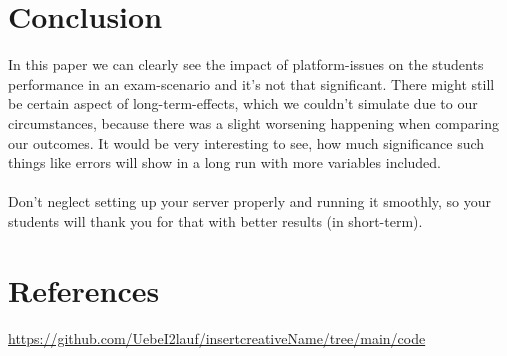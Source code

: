 \documentclass[12pt, a4paper]{article}
\begin{document}
\section{Conclusion}
In this paper we can clearly see the impact of platform-issues on the students performance in an exam-scenario and it's not that significant. There might still be certain aspect of long-term-effects,
which we couldn't simulate due to our circumstances, because there was a slight worsening happening when comparing our outcomes. It would be very interesting to see, how much significance such things like errors will show  in a long run with more variables included. \\\\
Don't neglect setting up your server properly and running it smoothly, so your students will thank you for that with better results (in short-term). 

\section{References}
\url{https://github.com/UebeI2lauf/insertcreativeName/tree/main/code}
\end{document}
